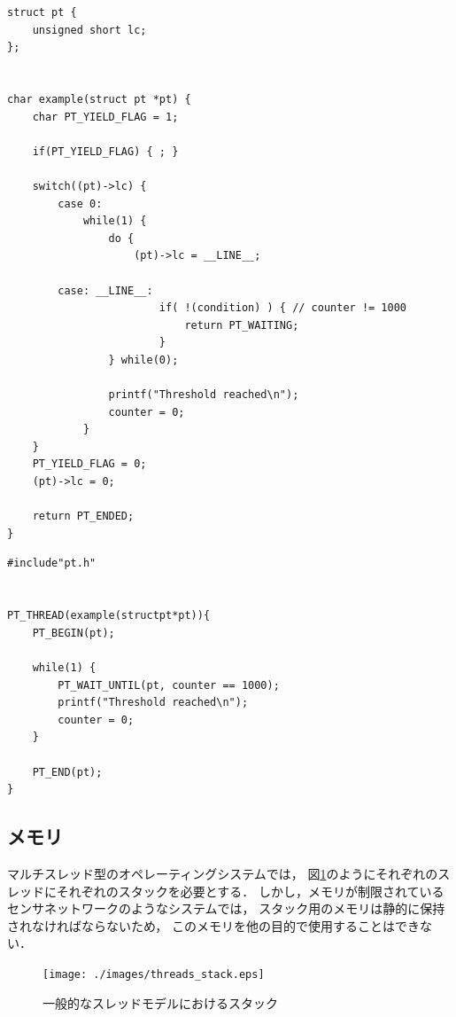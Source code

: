 \begin{lstlisting}[caption=Protothredsを使用せずに記述した場合, label={lst:non-protothreads}]
struct pt {
    unsigned short lc;
};


char example(struct pt *pt) { 
    char PT_YIELD_FLAG = 1;

    if(PT_YIELD_FLAG) { ; }

    switch((pt)->lc) {
        case 0:
            while(1) { 
                do {
                    (pt)->lc = __LINE__;

        case: __LINE__:
                        if( !(condition) ) { // counter != 1000
                            return PT_WAITING;
                        } 
                } while(0);

                printf("Threshold reached\n");
                counter = 0;
            } 
    }
    PT_YIELD_FLAG = 0;
    (pt)->lc = 0;

    return PT_ENDED;
}
\end{lstlisting}



\begin{lstlisting}[caption=Protothredsを使用した場合, label={lst:using-protothreads}]
#include"pt.h"


PT_THREAD(example(structpt*pt)){
    PT_BEGIN(pt);

    while(1) {
        PT_WAIT_UNTIL(pt, counter == 1000);
        printf("Threshold reached\n");
        counter = 0;
    }
    
    PT_END(pt); 
}
\end{lstlisting}




\subsection{メモリ}
マルチスレッド型のオペレーティングシステムでは，
図\ref{fig:threads_stack}のようにそれぞれのスレッドにそれぞれのスタックを必要とする．
しかし，メモリが制限されているセンサネットワークのようなシステムでは，
スタック用のメモリは静的に保持されなければならないため，
このメモリを他の目的で使用することはできない．
\begin{figure}[htbp]
 \begin{center}
  \texttt{[image: ./images/threads\_stack.eps]}
 \end{center}
 \caption{一般的なスレッドモデルにおけるスタック}
 \label{fig:threads_stack}
\end{figure}

